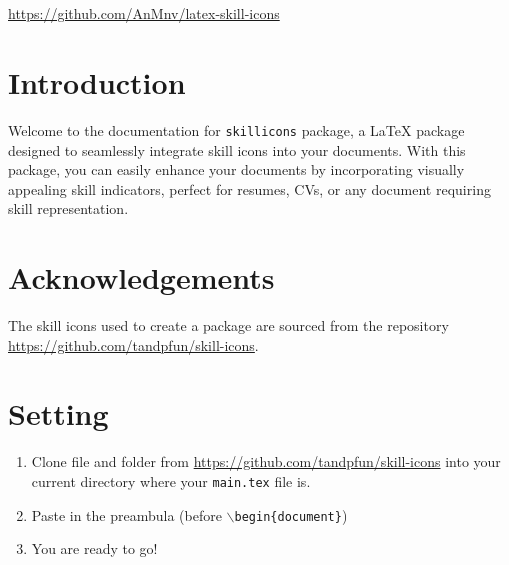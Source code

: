 \documentclass[12pt]{article}
\begin{document}
\begin{center}
\fontsize{40}{50} \\[1cm]  \\[1cm]
 
\Large \href{https://github.com/AnMnv/latex-skill-icons}{https://github.com/AnMnv/latex-skill-icons}\\[1cm]
\end{center}




 

\vspace*{3cm}






















 

 

\section*{Introduction}
Welcome to the documentation for \texttt{skillicons} package, a LaTeX package designed to seamlessly integrate skill icons into your documents. With this package, you can easily enhance your documents by incorporating visually appealing skill indicators, perfect for resumes, CVs, or any document requiring skill representation.


 
\section*{Acknowledgements}
The skill icons used to create a package are sourced from the repository \href{https://github.com/tandpfun/skill-icons}{https://github.com/tandpfun/skill-icons}.

\section*{Setting}
\begin{enumerate}
\item Clone  file and  folder from \href{https://github.com/tandpfun/skill-icons}{https://github.com/tandpfun/skill-icons} into your current directory where your \texttt{main.tex} file is.
\item Paste  in the preambula (before \texttt{$\backslash$begin\{document\}})
\item You are ready to go!
\end{enumerate}
\end{document}
